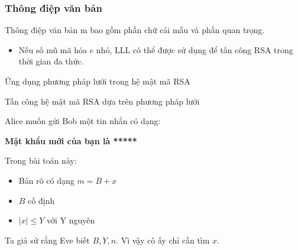 \documentclass{beamer}
\numberwithin{equation}{section}
\begin{document}
\begin{frame}
    \frametitle{Thông điệp văn bản}
    Thông điệp văn bản m bao gồm phần chữ cái mẫu và phần quan trọng.

    \begin{itemize}
        \item Nếu số mũ mã hóa \( e \) nhỏ, LLL có thể được sử dụng để tấn công RSA trong thời gian đa thức.
    \end{itemize}
\end{frame}



\begin{frame}{Ứng dụng phương pháp lưới trong hệ mật mã RSA}
\begin{block}{Tấn công hệ mật mã RSA dựa trên phương pháp lưới}

Alice muốn gửi Bob một tin nhắn có dạng:

    \textbf{Mật khẩu mới của bạn là *****}

Trong bài toán này:

\begin{itemize}
\item Bản rõ có dạng $m = B + x$
\item $B$ cố định
\item $|x| \leq Y$ với Y nguyên
\end{itemize}

Ta giả sử rằng Eve biết $B, Y, n$. Vì vậy cô ấy chỉ cần tìm $x$.
\end{block}

\end{frame}
\end{document}
